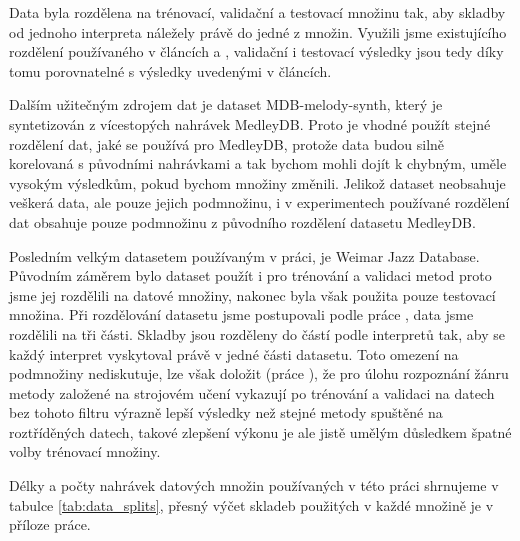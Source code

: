 Data byla rozdělena na trénovací, validační a testovací množinu tak, aby skladby od jednoho interpreta náležely právě do jedné z množin. Využili jsme existujícího rozdělení používaného v článcích \cite{Bittner2017} a \cite{DBasaranSEssid2018}, validační i testovací výsledky jsou tedy díky tomu porovnatelné s výsledky uvedenými v článcích.


Dalším užitečným zdrojem dat je dataset MDB-melody-synth, který je syntetizován z vícestopých nahrávek MedleyDB. Proto je vhodné použít stejné rozdělení dat, jaké se používá pro MedleyDB, protože data budou silně korelovaná s původními nahrávkami a tak bychom mohli dojít k chybným, uměle vysokým výsledkům, pokud bychom množiny změnili. Jelikož dataset neobsahuje veškerá data, ale pouze jejich podmnožinu, i v experimentech používané rozdělení dat obsahuje pouze podmnožinu z původního rozdělení datasetu MedleyDB. 

Posledním velkým datasetem používaným v práci, je Weimar Jazz Database. Původním záměrem bylo dataset použít i pro trénování a validaci metod proto jsme jej rozdělili na datové množiny, nakonec byla však použita pouze testovací množina. Při rozdělování datasetu jsme postupovali podle práce \cite{Bittner2017}, data jsme rozdělili na tři části. Skladby jsou rozděleny do částí podle interpretů tak, aby se každý interpret vyskytoval právě v jedné části datasetu. Toto omezení na podmnožiny \cite{Bittner2017} nediskutuje, lze však doložit (práce \cite{Sturm2013}), že pro úlohu rozpoznání žánru metody založené na strojovém učení vykazují po trénování a validaci na datech bez tohoto filtru výrazně lepší výsledky než stejné metody spuštěné na roztříděných datech, takové zlepšení výkonu je ale jistě umělým důsledkem špatné volby trénovací množiny. 

Délky a počty nahrávek datových množin používaných v této práci shrnujeme v tabulce \ref{tab:data_splits}, přesný výčet skladeb použitých v každé množině je v příloze práce.

